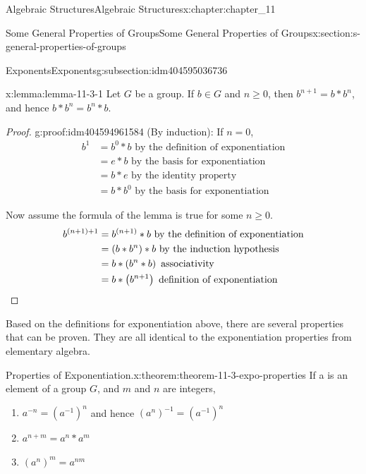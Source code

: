 \documentclass[twoside,10pt,]{book}
\newcommand{\qedhere}{\relax}
\numberwithin{equation}{section}
\begin{document}
\begin{chapterptx}{Algebraic Structures}{}{Algebraic Structures}{}{}{x:chapter:chapter_11}
\begin{sectionptx}{Some General Properties of Groups}{}{Some General Properties of Groups}{}{}{x:section:s-general-properties-of-groups}
\begin{subsectionptx}{Exponents}{}{Exponents}{}{}{g:subsection:idm404595036736}
\begin{lemma}{}{}{x:lemma:lemma-11-3-1}%
Let \(G\) be a group.  If \(b\in G\) and \(n\geq 0\), then  \(b^{n+1}=b* b^n\), and hence  \(b* b^n= b^n*b\).%
\end{lemma}
\begin{proof}{}{g:proof:idm404594961584}
(By induction):  If  \(n=0\),%
\begin{equation*}
\begin{split}
b^1 &= b^0*b \textrm{          by the definition of exponentiation}\\
& =e*b\textrm{    by the basis for exponentiation}\\
&= b * e\textrm{       by the identity property}\\
&= b * b^0\textrm{    by the basis for exponentiation}
\end{split}
\end{equation*}
%
\par
Now assume the formula of the lemma is true for some \(n\geq 0\).%
\begin{equation*}
\begin{split}
b^{(n+1)+1} &= b^{(n+1)}* b\textrm{           by the definition of exponentiation}\\
&= \left(b*b^n\right)*b\textrm{        by the induction hypothesis}\\
& = b*\left(b^n*b\right)\textrm{       associativity}\\
& = b*\left(b^{n+1}\right)\textrm{       definition of exponentiation}\\
\end{split}\qedhere
\end{equation*}
%
\end{proof}
Based on the definitions for exponentiation above, there are several properties that can be proven. They are all identical to the exponentiation properties from elementary algebra.%
\begin{theorem}{Properties of Exponentiation.}{}{x:theorem:theorem-11-3-expo-properties}%
If a is an element of a group \(G\), and \(m\) and \(n\) are integers,%
\begin{enumerate}[label=(\arabic*)]
\item{}\(a^{-n}= \left(a^{-1}\right)^n\)    and hence  \(\left(a^n\right)^{-1}= \left(a^{-1}\right)^n\)%
\item{}\(a^{n+m}= a^n*a^m\)%
\item{}\(\left(a^n\right)^m= a^{n m}\)%
\end{enumerate}
%
\end{theorem}

\end{subsectionptx}
\end{sectionptx}
\end{chapterptx}
\end{document}
